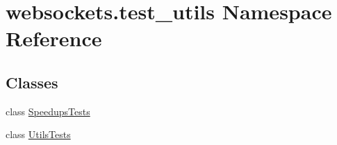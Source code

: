 \hypertarget{namespacewebsockets_1_1test__utils}{}\section{websockets.\+test\+\_\+utils Namespace Reference}
\label{namespacewebsockets_1_1test__utils}
\subsection*{Classes}
\begin{DoxyCompactItemize}
\item 
class \hyperlink{classwebsockets_1_1test__utils_1_1_speedups_tests}{Speedups\+Tests}
\item 
class \hyperlink{classwebsockets_1_1test__utils_1_1_utils_tests}{Utils\+Tests}
\end{DoxyCompactItemize}
